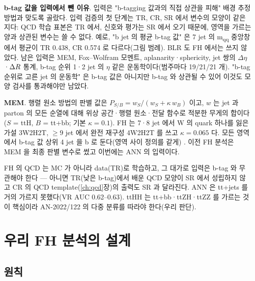 \textbf{b-tag 값을 입력에서 뺀 이유}. 입력은 "b-tagging 값과의 직접 상관을 피해" 배경 추정 방법과 맞도록 골랐다.
입력 검증의 첫 단계는 TR, CR, SR 에서 변수의 모양이 같은지다: QCD 학습 표본은 TR 에서, 신호와 평가는 SR 에서 오기 때문에, 영역을 가르는 양과
상관된 변수는 쓸 수 없다. 예로, "b jet 의 평균 b-tag 값" 은 7 jet 의 m\textsubscript{qq} 중앙창에서 평균이 TR 0.438,
CR 0.574 로 다르다(그림 범례). BLR 도 FH 에서는 쓰지 않았다. 남은 입력은 MEM, Fox–Wolfram 모멘트,
aplanarity·sphericity, jet 쌍의 $\Delta\eta$·$\Delta R$ 통계, b-tag 순위 1·2 jet 의 $\eta$ 같은 운동학이다(범주마다 19/21/21 개).
"b-tag 순위로 고른 jet 의 운동학" 은 b-tag 값은 아니지만 b-tag 와 상관될 수 있어 이것도 모양 검사를 통과해야만 남았다.

\textbf{MEM}. 행렬 원소 방법의 판별 값은 $P_{S/B}=w_S/(w_S+\kappa\,w_B)$ 이고, $w$ 는 jet 과 parton 의 모든 순열에 대해 위상 공간·행렬 원소·전달 함수로
적분한 무게의 합이다($S$ = ttH, $B$ = tt+bb; 기본 $\kappa=0.1$). FH 는 7·8 jet 에서 W 의 quark 하나를 잃은 가설
3W2H2T, $\ge9$ jet 에서 완전 재구성 4W2H2T 를 쓰고 $\kappa=0.065$ 다. 모든 영역에서 b-tag 값 상위 4 jet 을 b 로 둔다(영역 사이 정의를 같게)
. 이전 FH 분석은 MEM 을 최종 판별 변수로 썼고 이번에는 ANN 의 입력이다.

\begin{note}[ttH FH 에서 배울 점]
FH 의 QCD 는 MC 가 아니라 data(TR)로 학습하고, 그 대가로 입력은 b-tag 와 무관해야 한다 — 아니면 TR(낮은 b-tag)에서 배운 QCD 모양이 SR 에서 성립하지
않고 CR 의 QCD template(\ref{ch:qcd}장)의 출력도 SR 과 달라진다. ANN 은 tt+jets 를 거의 가르지 못했다(VR AUC 0.62--0.63). ttHH 는 tt+bb·ttZH·ttZZ
를 가르는 것이 핵심이라 AN-2022/122 의 다중 분류를 따라야 한다(우리 판단).
\end{note}

\section{우리 FH 분석의 설계}\label{sec:mva-ours}

\subsection{원칙}\label{sec:mva-ours-principle}

